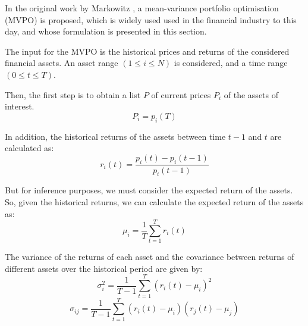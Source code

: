 \documentclass[prx,twocolumn,floatfix,superscriptaddress,longbibliography]{revtex4-1}
\begin{document}
In the original work by Markowitz \cite{Markowitz1952}, a mean-variance portfolio optimisation (MVPO) is proposed, which is widely used used in the financial industry to this day, and whose formulation is presented in this section.

The input for the MVPO is the historical prices and returns of the considered financial assets. An asset range $(1 \leq i \leq N)$ is considered, and a time range $(0 \leq t \leq T)$. 

Then, the first step is to obtain a list $P$ of current prices $P_i$  of the assets of interest.
\begin{equation}
  \label{eq:1}
  P_i = p_i(T)
\end{equation}

In addition, the historical returns of the assets between time $t-1$ and $t$ are calculated as:
\begin{equation}
  \label{eq:2}
  r_i(t) = \frac{p_i(t) - p_i(t-1)}{p_i(t-1)}
\end{equation}

But for inference purposes, we must consider the expected return of the assets. So, given the historical returns, we can calculate the expected return of the assets as:
\begin{equation}
  \label{eq:3}
  \mu_i = \frac{1}{T} \sum_{t=1}^{T} r_i(t)
\end{equation}

The variance of the returns of each asset and the covariance between returns of different assets over the historical period are given by:
\begin{equation}
  \label{eq:4}
  \sigma_i^2 = \frac{1}{T-1} \sum_{t=1}^{T} (r_i(t) - \mu_i)^2
\end{equation}
\begin{equation}
  \label{eq:5}
  \sigma_{ij} = \frac{1}{T-1} \sum_{t=1}^{T} (r_i(t) - \mu_i)(r_j(t) - \mu_j)
\end{equation}
\end{document}
